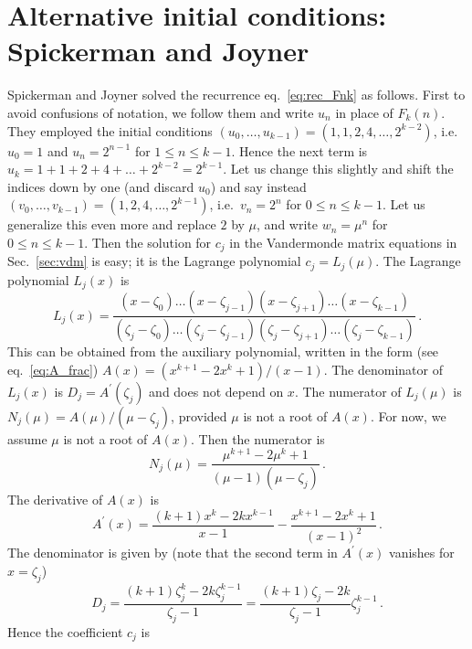 \documentclass[review]{elsarticle}
\theoremstyle{plain}
\begin{document}
\setcounter{equation}{0}
\section{Alternative initial conditions: Spickerman and Joyner}\label{sec:SJ}
Spickerman and Joyner \cite{SpickermanJoyner} solved the recurrence eq.~\eqref{eq:rec_Fnk} as follows.
First to avoid confusions of notation, we follow them and write $u_n$ in place of $F_k(n)$.
They employed the initial conditions
$(u_0,\dots,u_{k-1})=(1,1,2,4,\dots,2^{k-2})$, i.e.~$u_0 = 1$ and $u_n = 2^{n-1}$ for $1 \le n \le k-1$.
Hence the next term is $u_k = 1+1+2+4+\dots+2^{k-2} = 2^{k-1}$.
Let us change this slightly and shift the indices down by one (and discard $u_0$) and say instead
$(v_0,\dots,v_{k-1})=(1,2,4,\dots,2^{k-1})$, i.e.~$v_n = 2^n$ for $0\le n \le k-1$.
Let us generalize this even more and replace $2$ by $\mu$,
and write $w_n = \mu^n$ for $0\le n \le k-1$.
Then the solution for $c_j$ in the Vandermonde matrix equations in Sec.~\ref{sec:vdm} is easy;
it is the Lagrange polynomial $c_j = L_j(\mu)$.
The Lagrange polynomial $L_j(x)$ is
\begin{equation}
\label{eq:Lpoly}
L_j(x) = \frac{(x-\zeta_0)\dots(x-\zeta_{j-1})(x-\zeta_{j+1})\dots(x-\zeta_{k-1})}{(\zeta_j-\zeta_0)\dots
  (\zeta_j-\zeta_{j-1})(\zeta_j-\zeta_{j+1})\dots(\zeta_j-\zeta_{k-1})} \,.
\end{equation}
This can be obtained from the auxiliary polynomial, written in the form
(see eq.~\eqref{eq:A_frac})
$A(x) = (x^{k+1}-2x^k+1)/(x-1)$.
The denominator of $L_j(x)$ is $D_j = A^\prime(\zeta_j)$ and does not depend on $x$.
The numerator of $L_j(\mu)$ is $N_j(\mu) = A(\mu)/(\mu-\zeta_j)$, provided $\mu$ is not a root of $A(x)$.
For now, we assume $\mu$ is not a root of $A(x)$.
Then the numerator is
\begin{equation}
N_j(\mu) = \frac{\mu^{k+1}-2\mu^k+1}{(\mu-1)(\mu-\zeta_j)} \,.
\end{equation}
The derivative of $A(x)$ is
\begin{equation}
A^\prime(x) = \frac{(k+1)x^k-2kx^{k-1}}{x-1} -\frac{x^{k+1}-2x^k+1}{(x-1)^2} \,.
\end{equation}
The denominator is given by (note that the second term in $A^\prime(x)$ vanishes for $x=\zeta_j$)
\begin{equation}
\label{eq:denom_Lpoly}
D_j = \frac{(k+1)\zeta_j^k-2k\zeta_j^{k-1}}{\zeta_j-1} = \frac{(k+1)\zeta_j-2k}{\zeta_j-1}\zeta_j^{k-1} \,.
\end{equation}
Hence the coefficient $c_j$ is 
\end{document}
